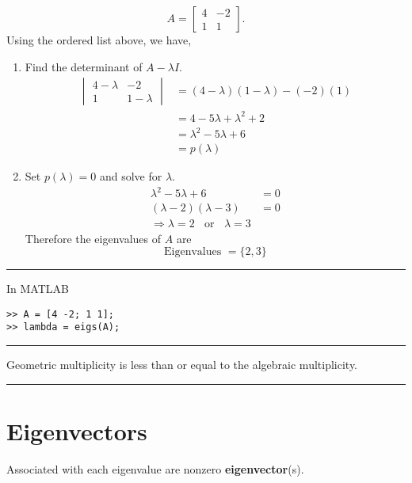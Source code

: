 \begin{example}
	\[ A =  \begin{bmatrix} 4 & -2 \\ 1  & 1 \end{bmatrix}. \]
	Using the ordered list above, we have, 
	
	\begin{enumerate}
	\item Find the determinant of $A - \lambda I$.  
	\begin{align*}   
	\begin{vmatrix} 4 -\lambda & -2 \\ 1  & 1-\lambda \end{vmatrix} &= (4-\lambda)(1-\lambda)-(-2)(1)\\
	&= 4-5 \lambda + \lambda^2 +2\\
	 &= \lambda^2 - 5\lambda+6\\
	 &= p(\lambda)
	 \end{align*}
	
	
	
		\item Set $p(\lambda) = 0$ and solve for $\lambda$.  
		\begin{align*}
			\lambda^2 - 5\lambda+6 &= 0\\
			(\lambda - 2)(\lambda - 3) &= 0\\
			\Rightarrow \lambda = 2 \;\; \text{ or } \;\; \lambda  = 3
		\end{align*}
		Therefore the eigenvalues of $A$ are 
		\[  \text{Eigenvalues } = \{ 2,3 \} \]
		\end{enumerate}	


	
\end{example}

\rule[0.01in]{\textwidth}{0.0025in}
In MATLAB
\begin{verbatim}
>> A = [4 -2; 1 1];
>> lambda = eigs(A);
\end{verbatim}
\rule[0.01in]{\textwidth}{0.0025in}

\begin{fact}
Geometric multiplicity is less than or equal to the algebraic multiplicity.
\end{fact}

\rule[0.01in]{\textwidth}{0.0025in}






\section{Eigenvectors}
Associated with each eigenvalue are nonzero \textbf{eigenvector}(s).  

